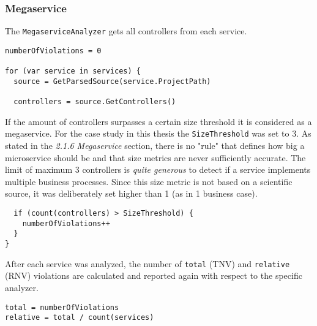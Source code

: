 \documentclass{article}
\begin{document}
\subsubsection{Megaservice}
The \lstinline{MegaserviceAnalyzer} gets all controllers from each service.
\begin{lstlisting}
numberOfViolations = 0

for (var service in services) {
  source = GetParsedSource(service.ProjectPath)

  controllers = source.GetControllers()
\end{lstlisting}
If the amount of controllers surpasses a certain size threshold it is considered as a megaservice. For the case study in this thesis the \lstinline{SizeThreshold} was set to 3. As stated in the \textit{2.1.6 Megaservice} section, there is no "rule" that defines how big a microservice should be and that size metrics are never sufficiently accurate. The limit of maximum 3 controllers is \textit{quite generous} to detect if a service implements multiple business processes. Since this size metric is not based on a scientific source, it was deliberately set higher than 1 (as in 1 business case).
\begin{lstlisting}
  if (count(controllers) > SizeThreshold) {
    numberOfViolations++
  }
}
\end{lstlisting}
After each service was analyzed, the number of \lstinline{total} (TNV) and \lstinline{relative} (RNV) violations are calculated and reported again with respect to the specific analyzer.
\begin{lstlisting}
total = numberOfViolations
relative = total / count(services)
\end{lstlisting}
\end{document}
